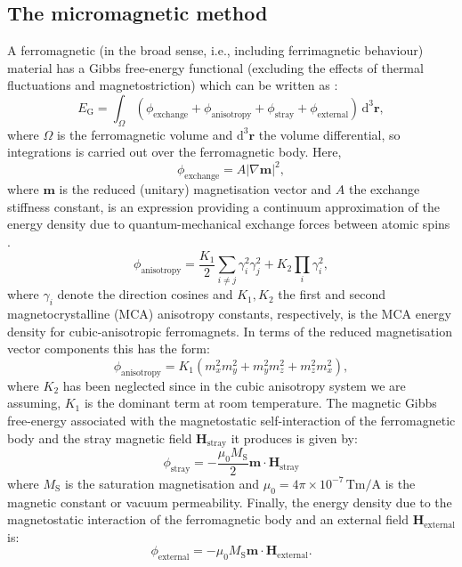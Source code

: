 \subsection{The micromagnetic method}
A ferromagnetic (in the broad sense, i.e., including ferrimagnetic behaviour) material has a Gibbs free-energy functional (excluding the effects of thermal fluctuations and magnetostriction) which can be written as \citep{Brown}:
\begin{equation}
E_\text{G} = \int_{\Omega} (\phi_{\text{exchange}} + \phi_{\text{anisotropy}} + \phi_{\text{stray}} + \phi_{\text{external}})\,\text{d}^3 \boldsymbol{r},
\end{equation}
where $\Omega$ is the ferromagnetic volume and $\text{d}^3 \boldsymbol{r}$ the volume differential, so integrations is carried out over the ferromagnetic body. Here,
\begin{equation}
\phi_{\text{exchange}}=A|\nabla\boldsymbol{m}|^2,
\end{equation}
where $\boldsymbol{m}$ is the reduced (unitary) magnetisation vector and $A$ the exchange stiffness constant, is an expression providing a continuum approximation of the energy density due to quantum-mechanical exchange forces between atomic spins \citep{Landau1935}.
\begin{equation}
\phi_{\text{anisotropy}}=\frac{K_1}{2}\sum_{i\neq j}\gamma_i^2\gamma_j^2 + K_2\prod_i\gamma_i^2,
\end{equation}
where $\gamma_i$ denote the direction cosines and $K_1,K_2$ the first and second magnetocrystalline (MCA) anisotropy constants, respectively, is the MCA energy density for cubic-anisotropic ferromagnets. In terms of the reduced magnetisation vector components this has the form:
\begin{equation}
\phi_{\text{anisotropy}}=K_1(m_x^2m_y^2+m_y^2m_z^2+m_z^2m_x^2),
\end{equation}
where $K_2$ has been neglected since in the cubic anisotropy system we are assuming, $K_1$ is the dominant term at room temperature. The magnetic Gibbs free-energy associated with the magnetostatic self-interaction of the ferromagnetic body and the stray magnetic field $\boldsymbol{H}_{\text{stray}}$ it produces is given by:
\begin{equation}
\phi_{\text{stray}}=-\frac{\mu_0M_\text{S}}{2} \boldsymbol{m} \cdot \boldsymbol{H}_{\text{stray}}
\end{equation}
where $M_\text{S}$ is the saturation magnetisation and $\mu_0=4\pi \times 10^{{-}7}\,\text{T}\text{m}/\text{A}$ is the magnetic constant or vacuum permeability. Finally, the energy density due to the magnetostatic interaction of the ferromagnetic body and an external field $\boldsymbol{H}_{\text{external}}$ is:
\begin{equation}
\phi_{\text{external}}=-\mu_0 M_{\text{S}} \boldsymbol{m} \cdot \boldsymbol{H}_{\text{external}}.
\end{equation}

